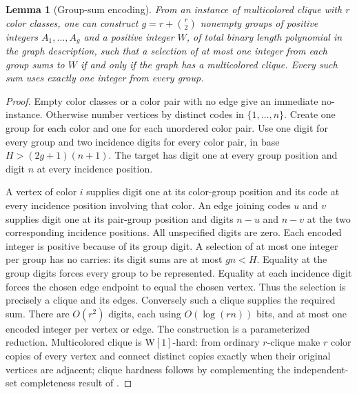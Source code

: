 \documentclass[11pt,letterpaper]{article}
\newtheorem{lemma}[theorem]{Lemma}
\theoremstyle{definition}\newtheorem{remark}[theorem]{Remark}
\begin{document}
\begin{lemma}[Group-sum encoding]\label{lem:groupsum59}
From an instance of multicolored clique with $r$ color classes, one can construct $g=r+\binom r2$ nonempty groups of positive integers $A_1,\ldots,A_g$ and a positive integer $W$, of total binary length polynomial in the graph description, such that a selection of at most one integer from each group sums to $W$ if and only if the graph has a multicolored clique. Every such sum uses exactly one integer from every group.
\end{lemma}
\begin{proof}
Empty color classes or a color pair with no edge give an immediate no-instance. Otherwise number vertices by distinct codes in $\{1,\ldots,n\}$. Create one group for each color and one for each unordered color pair. Use one digit for every group and two incidence digits for every color pair, in base $H>(2g+1)(n+1)$. The target has digit one at every group position and digit $n$ at every incidence position.

A vertex of color $i$ supplies digit one at its color-group position and its code at every incidence position involving that color. An edge joining codes $u$ and $v$ supplies digit one at its pair-group position and digits $n-u$ and $n-v$ at the two corresponding incidence positions. All unspecified digits are zero. Each encoded integer is positive because of its group digit. A selection of at most one integer per group has no carries: its digit sums are at most $gn<H$. Equality at the group digits forces every group to be represented. Equality at each incidence digit forces the chosen edge endpoint to equal the chosen vertex. Thus the selection is precisely a clique and its edges. Conversely such a clique supplies the required sum. There are $O(r^2)$ digits, each using $O(\log(rn))$ bits, and at most one encoded integer per vertex or edge. The construction is a parameterized reduction. Multicolored clique is $\mathrm{W}[1]$-hard: from ordinary $r$-clique make $r$ color copies of every vertex and connect distinct copies exactly when their original vertices are adjacent; clique hardness follows by complementing the independent-set completeness result of \citet{DowneyFellows1995b}.
\end{proof}
\end{document}
